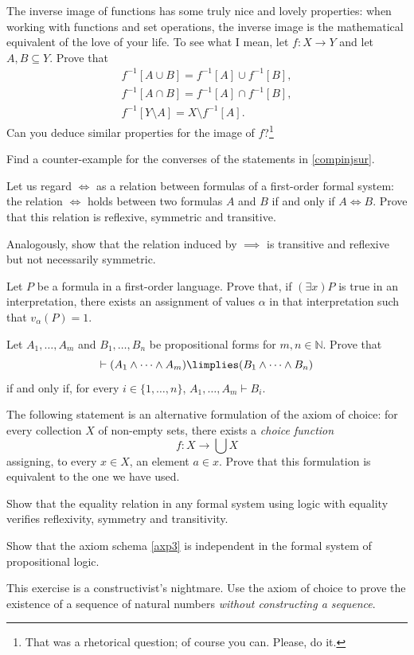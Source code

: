 

\begin{exercises}

\item The inverse image of functions has some truly nice and lovely properties: when working with functions and set operations, the inverse image is the mathematical equivalent of the love of your life. To see what I mean, let $f:X\longrightarrow Y$ and let $A,B\subseteq Y$. Prove that
\begin{gather*}
f^{-1}[A\cup B] = f^{-1}[A] \cup f^{-1}[B],\\
f^{-1}[A\cap B] = f^{-1}[A] \cap f^{-1}[B],\\
f^{-1}[Y\setminus A] = X\setminus f^{-1}[A].
\end{gather*}
Can you deduce similar properties for the image of $f$?\footnote{That was a rhetorical question; of course you can. Please, do it.}


\item Find a counter-example for the converses of the statements in \ref{compinjsur}.

\item Let us regard $\iff$ as a relation between formulas of a first-order formal system: the relation $\iff$ holds between two formulas $A$ and $B$ if and only if $A\iff B$.
Prove that this relation is reflexive, symmetric and transitive.

Analogously, show that the relation induced by $\implies $ is transitive and reflexive but not necessarily symmetric.


\item Let $P$ be a formula in a first-order language.
Prove that, if $(\exists x) P$ is true in an interpretation, there exists an assignment of values $\alpha$ in that interpretation such that $v_\alpha(P) = 1$.

\item Let $A_1,\ldots,A_m$ and $B_1,\ldots,B_n$ be propositional forms for $m,n\in\mathbb{N}$. Prove that
\[ \vdash (A_1\land \cdots \land A_m) \limplies (B_1\land \cdots \land B_n)\]
if and only if, for every $i\in \{1,\ldots,n\}$, $A_1,\ldots,A_m\vdash B_i$.

\item The following statement is an alternative formulation of the axiom of choice: for every collection $X$ of non-empty sets, there exists a \emph{choice function}
\[f: X\longrightarrow \bigcup X\]
assigning, to every $x\in X$, an element $a\in x$. Prove that this formulation is equivalent to the one we have used.

\item Show that the equality relation in any formal system using logic with equality verifies reflexivity, symmetry and transitivity.

\item Show that the axiom schema \ref{axp3} is independent in the formal system of propositional logic.

\item This exercise is a constructivist's nightmare.
Use the axiom of choice to prove the existence of a sequence of natural numbers \emph{without constructing a sequence}.
\end{exercises}
